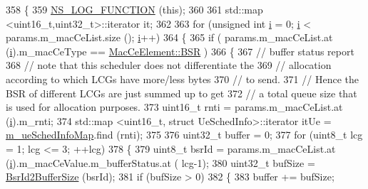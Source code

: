 \begin{DoxyCode}
358 \{
359         \hyperlink{log-macros-disabled_8h_a90b90d5bad1f39cb1b64923ea94c0761}{NS\_LOG\_FUNCTION} (\textcolor{keyword}{this});
360 
361         std::map <uint16\_t,uint32\_t>::iterator it;
362 
363         \textcolor{keywordflow}{for} (\textcolor{keywordtype}{unsigned} \textcolor{keywordtype}{int} \hyperlink{bernuolliDistribution_8m_a6f6ccfcf58b31cb6412107d9d5281426}{i} = 0; \hyperlink{bernuolliDistribution_8m_a6f6ccfcf58b31cb6412107d9d5281426}{i} < params.m\_macCeList.size (); \hyperlink{bernuolliDistribution_8m_a6f6ccfcf58b31cb6412107d9d5281426}{i}++)
364         \{
365                 \textcolor{keywordflow}{if} ( params.m\_macCeList.at (\hyperlink{bernuolliDistribution_8m_a6f6ccfcf58b31cb6412107d9d5281426}{i}).m\_macCeType == \hyperlink{structns3_1_1MacCeElement_a7b68183e7a7fd9b02783f92a2c645d7ba459101d6c51f15c22bfdf75d68f9c631}{MacCeElement::BSR} )
366                 \{
367                         \textcolor{comment}{// buffer status report}
368                         \textcolor{comment}{// note that this scheduler does not differentiate the}
369                         \textcolor{comment}{// allocation according to which LCGs have more/less bytes}
370                         \textcolor{comment}{// to send.}
371                         \textcolor{comment}{// Hence the BSR of different LCGs are just summed up to get}
372                         \textcolor{comment}{// a total queue size that is used for allocation purposes.}
373                         uint16\_t rnti = params.m\_macCeList.at (\hyperlink{bernuolliDistribution_8m_a6f6ccfcf58b31cb6412107d9d5281426}{i}).m\_rnti;
374                 std::map <uint16\_t, struct UeSchedInfo>::iterator itUe = 
      \hyperlink{classns3_1_1MmWaveFlexTtiMaxRateMacScheduler_ac8359b3799f29f5b49e0f2dd52acd0ab}{m\_ueSchedInfoMap}.find (rnti);
375 
376                         uint32\_t buffer = 0;
377                         \textcolor{keywordflow}{for} (uint8\_t lcg = 1; lcg <= 3; ++lcg)
378                         \{
379                                 uint8\_t bsrId = params.m\_macCeList.at (\hyperlink{bernuolliDistribution_8m_a6f6ccfcf58b31cb6412107d9d5281426}{i}).m\_macCeValue.m\_bufferStatus.at (
      lcg-1);
380                                 uint32\_t bufSize = \hyperlink{classns3_1_1MmWaveFlexTtiMaxRateMacScheduler_a756194c4791d85b39382f9b242eadb4d}{BsrId2BufferSize} (bsrId);
381                                 \textcolor{keywordflow}{if} (bufSize > 0)
382                                 \{
383                                         buffer += bufSize;

\end{DoxyCode}
